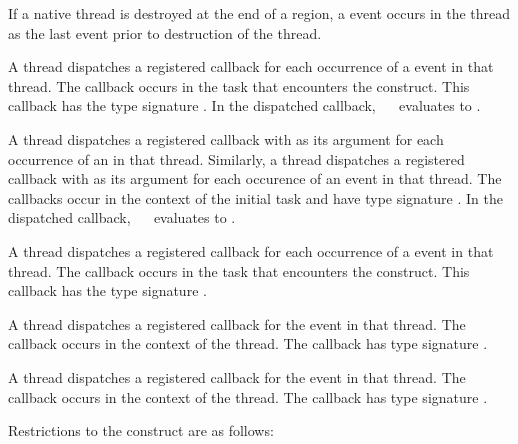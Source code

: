If a native thread is destroyed at the end of a  region, a
 event occurs in the thread as the last event prior 
to destruction of the thread.

\tools

A thread dispatches a registered 
callback for each occurrence of a  event in that
thread.  The callback occurs in the task that encounters the 
 construct.  This callback has the type signature
. In the dispatched callback, 
\code{(}~\code{&}~ evaluates to .

A thread dispatches a registered 
callback with  as its  argument
for each occurrence of an  in that thread.
Similarly, a thread dispatches a registered 
callback with  as its  argument
for each occurence of an  event in that thread. 
The callbacks occur in the context of the initial task and have type 
signature . In the dispatched
callback, \code{(}~\code{&}~ evaluates to
.

A thread dispatches a registered 
callback for each occurrence of a  event in that
thread.  The callback occurs in the task that encounters
the  construct.  This callback has the type signature
.

A thread dispatches a registered 
callback for the  event in that thread.
The callback occurs in the context of the thread.  The callback 
has type signature .

A thread dispatches a registered 
callback for the  event in that thread. The callback 
occurs in the context of the thread.  The callback has type signature
.

\restrictions
Restrictions to the  construct are as follows:

